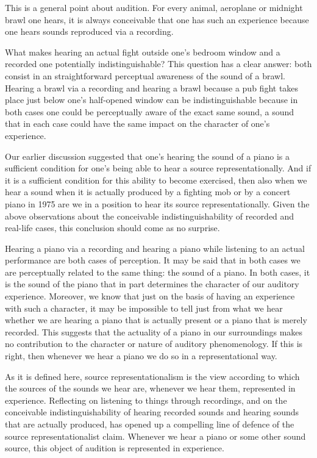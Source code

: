 \documentclass[sloppy, journal, git, anonymise, dodraft]{humapap}
\begin{document}
This is a general point about audition. For every animal, aeroplane or
midnight brawl one hears, it is always conceivable that one has such an
experience because one hears sounds reproduced via a recording.

What makes hearing an actual fight outside one's bedroom window and a
recorded one potentially indistinguishable? This question has a clear
answer: both consist in an straightforward perceptual awareness of the
sound of a brawl. Hearing a brawl via a recording and hearing a brawl
because a pub fight takes place just below one's half-opened window can
be indistinguishable because in both cases one could be perceptually
aware of the exact same sound, a sound that in each case could have the
same impact on the character of one's experience.

Our earlier discussion suggested that one's hearing the sound of a piano
is a sufficient condition for one's being able to hear a source
representationally. And if it is a sufficient condition for this ability
to become exercised, then also when we hear a sound when it is actually
produced by a fighting mob or by a concert piano in 1975 are we in a position to
hear its source representationally. Given the above observations about
the conceivable indistinguishability of recorded and real-life cases,
this conclusion should come as no surprise.

Hearing a piano via a recording and hearing a piano while listening to
an actual performance are both cases of perception. It may be said that
in both cases we are perceptually related to the same thing: the sound
of a piano. In both cases, it is the sound of the piano that in part
determines the character of our auditory experience. Moreover, we know
that just on the basis of having an experience with such a character, it
may be impossible to tell just from what we hear whether we are hearing
a piano that is actually present or a piano that is merely recorded.
This suggests that the actuality of a piano in our surroundings makes no
contribution to the character or nature of auditory phenomenology. If this is right, then whenever we hear a piano we do so in a representational way.

\sect As it is defined here, source representationalism is the view according
to which the sources of the sounds we hear are, whenever we hear them,
represented in experience. Reflecting on listening to things through
recordings, and on the conceivable indistinguishability of hearing
recorded sounds and hearing sounds that are actually produced, has
opened up a compelling line of defence of the source representationalist
claim. Whenever we hear a piano or some other sound source, this object
of audition is represented in experience.
\end{document}
